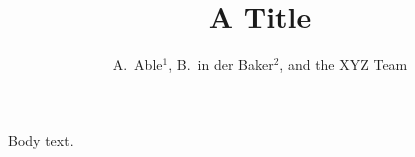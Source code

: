 \documentclass{amsart}
\begin{document}
\title{A Title}
\author{A.~Able$^{1}$, B.~in der Baker$^{2}$, and the XYZ Team}
\address{$^{1}$ Institute of One; $^{2}$ University of Two}
\maketitle
Body text.
\end{document}
